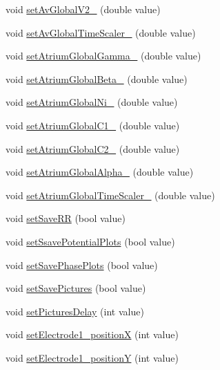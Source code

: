 \begin{DoxyCompactItemize}
void \hyperlink{classatrial_parameters_a93d13234748730c7850cf36525a40b71}{set\+Av\+Global\+V2\+\_} (double value)
\item 
void \hyperlink{classatrial_parameters_a510dcbc3ee2997b618474595176ae1bf}{set\+Av\+Global\+Time\+Scaler\+\_} (double value)
\item 
void \hyperlink{classatrial_parameters_a5a42c07d852c4d034798acad60b4bc90}{set\+Atrium\+Global\+Gamma\+\_} (double value)
\item 
void \hyperlink{classatrial_parameters_a565dcda6238511b7ac426bebc6efc591}{set\+Atrium\+Global\+Beta\+\_} (double value)
\item 
void \hyperlink{classatrial_parameters_ad6b7ed91bba174fc0384aa779af0b217}{set\+Atrium\+Global\+Ni\+\_} (double value)
\item 
void \hyperlink{classatrial_parameters_a6787a409b2f58c0b3404d9ad92183497}{set\+Atrium\+Global\+C1\+\_} (double value)
\item 
void \hyperlink{classatrial_parameters_adbdea229fc948ee9b66c7e374ada2c07}{set\+Atrium\+Global\+C2\+\_} (double value)
\item 
void \hyperlink{classatrial_parameters_a499526e46d0c55c95f1e15a5bd08a69e}{set\+Atrium\+Global\+Alpha\+\_} (double value)
\item 
void \hyperlink{classatrial_parameters_ac4f6b96428e4f1db6f09a54963728eb2}{set\+Atrium\+Global\+Time\+Scaler\+\_} (double value)
\item 
void \hyperlink{classatrial_parameters_a950313f8a0a6bcb0d818cee5a26f3477}{set\+Save\+R\+R} (bool value)
\item 
void \hyperlink{classatrial_parameters_ab299e636262065b0423eff7ed72bc263}{set\+Ssave\+Potential\+Plots} (bool value)
\item 
void \hyperlink{classatrial_parameters_a8b026a6bf17e0db843e270df17402b80}{set\+Save\+Phase\+Plots} (bool value)
\item 
void \hyperlink{classatrial_parameters_a82ea1217c9a9aff9708b60f267404f43}{set\+Save\+Pictures} (bool value)
\item 
void \hyperlink{classatrial_parameters_ae949242a4bd383e3c311f7def975d98b}{set\+Pictures\+Delay} (int value)
\item 
void \hyperlink{classatrial_parameters_abd17e877da4177a50b378111355f3c46}{set\+Electrode1\+\_\+position\+X} (int value)
\item 
void \hyperlink{classatrial_parameters_ad2ff037410e50382409c0993e09d9ae4}{set\+Electrode1\+\_\+position\+Y} (int value)

\end{DoxyCompactItemize}
